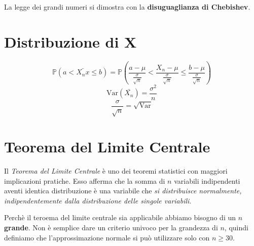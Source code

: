 
La legge dei grandi numeri si dimostra con la \textbf{disuguaglianza di Chebishev}.

\section{Distribuzione di X}
\begin{equation*}
    \mathbb{P} (a  < \bar{X_nx} \leq b) = \mathbb{P} (\frac{a - \mu}{\frac{\sigma}{\sqrt{n}}} 
    < \frac{X_n - \mu}{\frac{\sigma}{\sqrt{n}}} \leq \frac{b - \mu}{\frac{\sigma}{\sqrt{n}}})   
\end{equation*}
\begin{equation*}
    \text{Var}(\bar{X_n}) = \frac{\sigma ^ 2}{n} 
\end{equation*}
\begin{equation*}
    \frac{\sigma}{\sqrt{n}} = \sqrt{\text{Var}}
\end{equation*}

\pagebreak

\section{Teorema del Limite Centrale}
Il \emph{Teorema del Limite Centrale} è uno dei teoremi statistici con maggiori implicazioni pratiche. 
Esso afferma che la somma di $n$ variabili indipendenti aventi identica distribuzione è una variabile che 
\emph{si distribuisce normalmente, indipendentemente dalla distribuzione delle singole variabili}.

Perchè il teroema del limite centrale sia applicabile abbiamo bisogno di un $n$ \textbf{grande}.
Non è semplice dare un criterio univoco per la grandezza di $n$, quindi definiamo che l'approssimazione normale si può utilizzare solo con $n\geq 30$.

